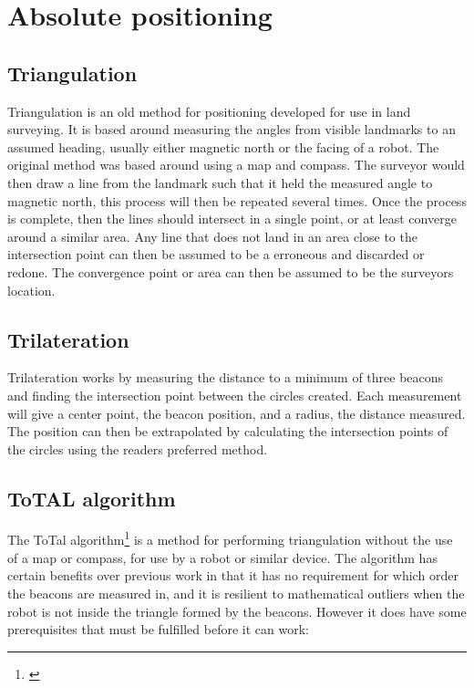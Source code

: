\section{Absolute positioning}

\subsection{Triangulation}

Triangulation is an old method for positioning developed for use in land surveying. It is based around measuring the angles from visible landmarks to an assumed heading, usually either magnetic north or the facing of a robot. The original method was based around using a map and compass. The surveyor would then draw a line from the landmark such that it held the measured angle to magnetic north, this process will then be repeated several times. Once the process is complete, then the lines should intersect in a single point, or at least converge around a similar area. Any line that does not land in an area close to the intersection point can then be assumed to be a erroneous and discarded or redone. The convergence point or area can then be assumed to be the surveyors location.

\subsection{Trilateration}

Trilateration works by measuring the distance to a minimum of three beacons and finding the intersection point between the circles created. Each measurement will give a center point, the beacon position, and a radius, the distance measured. The position can then be extrapolated by calculating the intersection points of the circles using the readers preferred method.

\subsection{ToTAL algorithm}

The ToTal algorithm\footnote{\cite{VincentPierlot2001}} is a method for performing triangulation without the use of a map or compass, for use by a robot or similar device. The algorithm has certain benefits over previous work in that it has no requirement for which order the beacons are measured in, and it is resilient to mathematical outliers when the robot is not inside the triangle formed by the beacons. However it does have some prerequisites that must be fulfilled before it can work:


